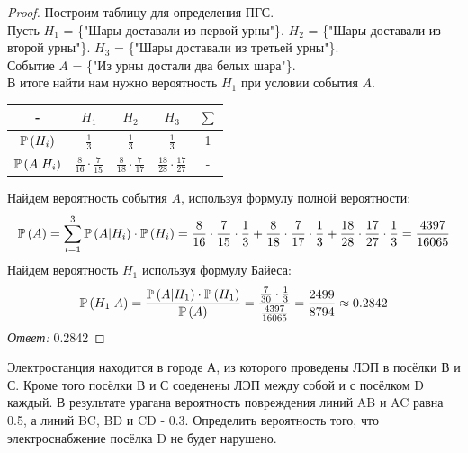 \begin{proof}
Построим таблицу для определения ПГС.\\
Пусть $ H_1 $ = \{"Шары доставали из первой урны"\}. $ H_2 $ = \{"Шары доставали из второй урны"\}. $ H_3 $ = \{"Шары доставали из третьей урны"\}.\\
Событие $ A $ = \{"Из урны достали два белых шара"\}.\\
В итоге найти нам нужно вероятность $ H_1 $ при условии события $ A $.
\begin{center}
\begin{tabular}{ |c|c|c|c|c| } 
    \hline
    - & $ H_1 $ & $ H_2 $ & $ H_3 $ & $ \sum $\\ 
    \hline
    $\mathbb P\left(H_i\right)$ & $\frac{1}{3}$ & $\frac{1}{3}$ & $\frac{1}{3}$ & 1\\ 
    \hline
    $\mathbb P\left(A|H_i\right)$ & $\frac{8}{16}\cdot\frac{7}{15}$ & $\frac{8}{18}\cdot\frac{7}{17}$ & $\frac{18}{28}\cdot\frac{17}{27}$ & - \\ 
    \hline
\end{tabular}
\end{center}
Найдем вероятность события $ A $, используя формулу полной вероятности:
\[
\mathbb P\left(A\right) = \sum_{i=1}^3 \mathbb P\left(A|H_i\right)\cdot\mathbb P\left(H_i\right) = \frac{8}{16}\cdot\frac{7}{15}\cdot\frac{1}{3} + \frac{8}{18}\cdot\frac{7}{17}\cdot\frac{1}{3} + \frac{18}{28}\cdot\frac{17}{27}\cdot\frac{1}{3} = \frac{4397}{16065}
\]
Найдем вероятность $ H_1 $ используя формулу Байеса:
\[
\mathbb P\left(H_1|A\right) = \frac{\mathbb P\left(A|H_1\right)\cdot\mathbb P\left(H_1\right)}{\mathbb P\left(A\right)} = \frac{\frac{7}{30}\cdot\frac{1}{3}}{\frac{4397}{16065}} = \frac{2499}{8794} \approx 0.2842
\]
{\it Ответ:} 0.2842
\end{proof}

\begin{problem}
Электростанция находится в городе А, из которого проведены ЛЭП в посёлки В и С. Кроме того посёлки В и С соеденены ЛЭП между собой и с посёлком D каждый. В результате урагана вероятность повреждения линий AB и AC равна 0.5, а линий BC, BD и CD - 0.3. Определить вероятность того, что электроснабжение посёлка D не будет нарушено.
\end{problem}

